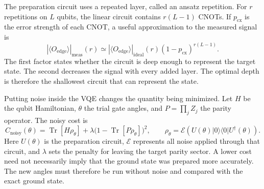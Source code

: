 The preparation circuit uses a repeated layer, called an ansatz repetition.
For $r$ repetitions on $L$ qubits, the linear circuit contains $r(L-1)$ CNOTs.
If $p_{\mathrm{cx}}$ is the error strength of each CNOT, a useful approximation
to the measured signal is
\begin{equation}
 |\langle O_{\mathrm{edge}}\rangle|_{\mathrm{meas}}(r)
 \simeq
 |\langle O_{\mathrm{edge}}\rangle|_{\mathrm{ideal}}(r)
 (1-p_{\mathrm{cx}})^{r(L-1)} .
 \label{eq:depth_tradeoff}
\end{equation}
The first factor states whether the circuit is deep enough to represent the
target state.  The second decreases the signal with every added layer.  The optimal depth is
therefore the shallowest circuit that can represent the state.

Putting noise inside the VQE changes the quantity being minimized.  Let $H$
be the qubit Hamiltonian, $\theta$ the trial gate angles, and
$P=\prod_j Z_j$ the parity operator.  The noisy cost is
\begin{equation}
 C_{\mathrm{noisy}}(\theta)
 =\operatorname{Tr}[H\rho_\theta]
 +\lambda\bigl(1-\operatorname{Tr}[P\rho_\theta]\bigr)^2,
 \qquad
 \rho_\theta=\mathcal E\!\left(U(\theta)|0\rangle\langle0|U^\dagger(\theta)\right).
 \label{eq:noisy_cost}
\end{equation}
Here $U(\theta)$ is the preparation circuit, $\mathcal E$ represents all
noise applied through that circuit, and $\lambda$ sets the penalty for leaving
the target parity sector.  A lower cost need
not necessarily imply that the ground state was prepared more accurately.  The new angles
must therefore be run without noise and compared with the exact ground state.
